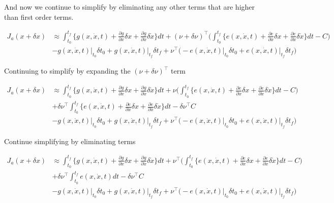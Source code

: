 \documentclass[11pt,letterpaper,onecolumn,notitlepage]{article}
\begin{document}
And now we continue to simplify by eliminating any other terms that are higher than first order terms.

\begin{align*}
  J_{a}(x+\delta x)&\approx
  \int_{t_{0}}^{t_{f}}\biggr\{g(x,\dot{x},t)+\frac{\partial{}g}{\partial{}x}\delta x+\frac{\partial{}g}{\partial\dot{x}}\delta\dot{x}\biggr\}dt
  +(\nu+\delta\nu)^{\top}\biggr(\int_{t_{0}}^{t_{f}}\biggr\{e(x,\dot{x},t)+\frac{\partial{}e}{\partial{}x}\delta x+\frac{\partial{}e}{\partial\dot{x}}\delta\dot{x}\biggr\}dt-C\biggr) \\
  &-g(x,\dot{x},t)\biggr|_{t_{0}}\delta t_{0}
  +g(x,\dot{x},t)\biggr|_{t_{f}}\delta t_{f}
  +\nu^{\top}\biggr(
  -e(x,\dot{x},t)\biggr|_{t_{0}}\delta t_{0}
  +e(x,\dot{x},t)\biggr|_{t_{f}}\delta t_{f}
  \biggr)
\end{align*}

Continuing to simplify by expanding the $(\nu+\delta\nu)^{\top}$ term

\begin{align*}
  J_{a}(x+\delta x)&\approx
  \int_{t_{0}}^{t_{f}}\biggr\{g(x,\dot{x},t)+\frac{\partial{}g}{\partial{}x}\delta x+\frac{\partial{}g}{\partial\dot{x}}\delta\dot{x}\biggr\}dt
  +\nu\biggr(\int_{t_{0}}^{t_{f}}\biggr\{e(x,\dot{x},t)+\frac{\partial{}e}{\partial{}x}\delta x+\frac{\partial{}e}{\partial\dot{x}}\delta\dot{x}\biggr\}dt-C\biggr) \\
  &+\delta\nu^{\top}\int_{t_{0}}^{t_{f}}\biggr\{e(x,\dot{x},t)+\frac{\partial{}e}{\partial{}x}\delta x+\frac{\partial{}e}{\partial\dot{x}}\delta\dot{x}\biggr\}dt-\delta\nu^{\top}C \\
  &-g(x,\dot{x},t)\biggr|_{t_{0}}\delta t_{0}
  +g(x,\dot{x},t)\biggr|_{t_{f}}\delta t_{f}
  +\nu^{\top}\biggr(
  -e(x,\dot{x},t)\biggr|_{t_{0}}\delta t_{0}
  +e(x,\dot{x},t)\biggr|_{t_{f}}\delta t_{f}
  \biggr)
\end{align*}

Continue simplifying by eliminating terms

\begin{align*}
  J_{a}(x+\delta x)&\approx
  \int_{t_{0}}^{t_{f}}\biggr\{g(x,\dot{x},t)+\frac{\partial{}g}{\partial{}x}\delta x+\frac{\partial{}g}{\partial\dot{x}}\delta\dot{x}\biggr\}dt
  +\nu^{\top}\biggr(\int_{t_{0}}^{t_{f}}\biggr\{e(x,\dot{x},t)+\frac{\partial{}e}{\partial{}x}\delta x+\frac{\partial{}e}{\partial\dot{x}}\delta\dot{x}\biggr\}dt-C\biggr) \\
  &+\delta\nu^{\top}\int_{t_{0}}^{t_{f}}e(x,\dot{x},t)dt-\delta\nu^{\top}C \\
  &-g(x,\dot{x},t)\biggr|_{t_{0}}\delta t_{0}
  +g(x,\dot{x},t)\biggr|_{t_{f}}\delta t_{f}
  +\nu^{\top}\biggr(
  -e(x,\dot{x},t)\biggr|_{t_{0}}\delta t_{0}
  +e(x,\dot{x},t)\biggr|_{t_{f}}\delta t_{f}
  \biggr)
\end{align*}
\end{document}
